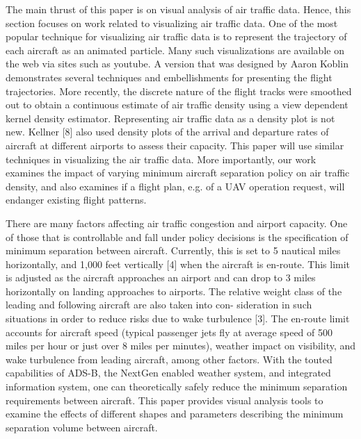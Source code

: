 The main thrust of this paper is on visual analysis of air traffic data. Hence, this section focuses on work related to visualizing air traffic data. One of the most popular technique for visualizing air traffic data is to represent the trajectory of each aircraft as an animated particle. Many such visualizations are available on the web via sites such as youtube. A version that was designed by Aaron Koblin demonstrates several techniques and embellishments for presenting the flight trajectories. More recently, the discrete nature of the flight tracks were smoothed out to obtain a continuous estimate of air traffic density using a view dependent kernel density estimator. Representing air traffic data as a density plot is not new. Kellner [8] also used density plots of the arrival and departure rates of aircraft at different airports to assess their capacity. This paper will use similar techniques in visualizing the air traffic data. More importantly, our work examines the impact of varying minimum aircraft separation policy on air traffic density, and also examines if a flight plan, e.g. of a UAV operation request, will endanger existing flight patterns.

There are many factors affecting air traffic congestion and airport capacity. One of those that is controllable and fall under policy decisions is the specification of minimum separation between aircraft. Currently, this is set to 5 nautical miles horizontally, and 1,000
feet vertically [4] when the aircraft is en-route. This limit is adjusted as the aircraft approaches an airport and can drop to 3 miles horizontally on landing approaches to airports. The relative weight class of the leading and following aircraft are also taken into con-
sideration in such situations in order to reduce risks due to wake turbulence [3]. The en-route limit accounts for aircraft speed (typical passenger jets fly at average speed of 500 miles per hour or just over 8 miles per minutes), weather impact on visibility, and wake turbulence from leading aircraft, among other factors. With the touted capabilities of ADS-B, the NextGen enabled weather system, and integrated information system, one can theoretically safely reduce the minimum separation requirements between aircraft. This paper provides visual analysis tools to examine the effects of different shapes and parameters describing the minimum separation volume between aircraft.

